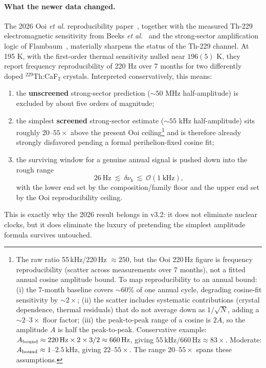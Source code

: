 \paragraph{What the newer data changed.}
The 2026 Ooi \emph{et al.} reproducibility paper~\cite{Ooi2026}, together with the measured Th-229 electromagnetic sensitivity from Beeks \emph{et al.}~\cite{Beeks2025} and the strong-sector amplification logic of Flambaum~\cite{Flambaum2006}, materially sharpens the status of the Th-229 channel.  At 195 K, with the first-order thermal sensitivity nulled near $196(5)$ K, they report frequency reproducibility of 220 Hz over 7 months for two differently doped $^{229}$Th:CaF$_2$ crystals.  Interpreted conservatively, this means:
\begin{enumerate}
\item the \textbf{unscreened} strong-sector prediction ($\sim 50$ MHz half-amplitude) is excluded by about five orders of magnitude;
\item the simplest \textbf{screened} strong-sector estimate ($\sim 55$ kHz half-amplitude) sits roughly $20$--$55\times$ above the present Ooi ceiling\footnote{The raw ratio 55\,kHz/220\,Hz $\approx 250$, but the Ooi 220\,Hz figure is frequency reproducibility (scatter across measurements over 7 months), not a fitted annual cosine amplitude bound.  To map reproducibility to an annual bound: (i) the 7-month baseline covers ${\sim}60\%$ of one annual cycle, degrading cosine-fit sensitivity by ${\sim}2\times$; (ii) the scatter includes systematic contributions (crystal dependence, thermal residuals) that do not average down as $1/\sqrt{N}$, adding a ${\sim}2$--$3\times$ floor factor; (iii) the peak-to-peak range of a cosine is $2A$, so the amplitude $A$ is half the peak-to-peak.  Conservative example: $A_{\rm bound} \approx 220\,\mathrm{Hz} \times 2 \times 3 / 2 \approx 660\,\mathrm{Hz}$, giving $55\,\mathrm{kHz}/660\,\mathrm{Hz} \approx 83\times$.  Moderate: $A_{\rm bound} \approx 1$--$2.5\,\mathrm{kHz}$, giving $22$--$55\times$.  The range $20$--$55\times$ spans these assumptions.} and is therefore already strongly disfavored pending a formal perihelion-fixed cosine fit;
\item the surviving window for a genuine annual signal is pushed down into the rough range
\begin{equation}\label{eq:surviving-window}
26~\mathrm{Hz}\ \lesssim\ \delta\nu_b\ \lesssim\ \mathcal{O}(1~\mathrm{kHz}),
\end{equation}
with the lower end set by the composition/family floor and the upper end set by the Ooi reproducibility ceiling.
\end{enumerate}
This is exactly why the 2026 result belongs in v3.2: it does not eliminate nuclear clocks, but it does eliminate the luxury of pretending the simplest amplitude formula survives untouched.

